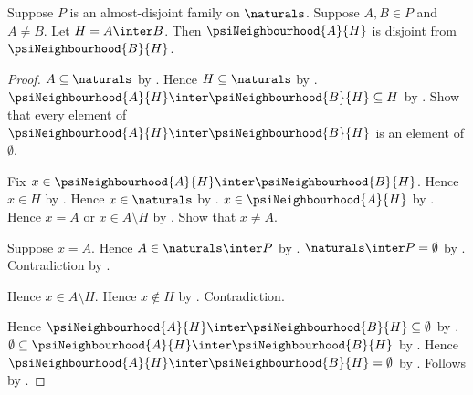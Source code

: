 \begin{proposition}\label{psi_distinct_family_neighbourhoods_disjoint}
    Suppose $P$ is an almost-disjoint family on $\naturals$.
    Suppose $A,B\in P$ and $A\neq B$.
    Let $H=A\inter B$.
    Then $\psiNeighbourhood{A}{H}$ is disjoint from
        $\psiNeighbourhood{B}{H}$.
\end{proposition}
\begin{proof}
    $A\subseteq\naturals$ by
        .
    Hence $H\subseteq\naturals$ by .
    $\psiNeighbourhood{A}{H}\inter\psiNeighbourhood{B}{H}
        \subseteq H$
        by .
    Show that every element of
        $\psiNeighbourhood{A}{H}\inter\psiNeighbourhood{B}{H}$
        is an element of $\emptyset$.
    \begin{subproof}
        Fix $x\in
            \psiNeighbourhood{A}{H}\inter\psiNeighbourhood{B}{H}$.
        Hence $x\in H$ by .
        Hence $x\in\naturals$ by .
        $x\in\psiNeighbourhood{A}{H}$ by .
        Hence $x=A$ or $x\in A\setminus H$
            by .
        Show that $x\neq A$.
        \begin{subproof}
            Suppose $x=A$.
            Hence $A\in\naturals\inter P$ by .
            $\naturals\inter P=\emptyset$
                by .
            Contradiction by .
        \end{subproof}
        Hence $x\in A\setminus H$.
        Hence $x\notin H$ by .
        Contradiction.
    \end{subproof}
    Hence $\psiNeighbourhood{A}{H}\inter
        \psiNeighbourhood{B}{H}\subseteq\emptyset$ by .
    $\emptyset\subseteq\psiNeighbourhood{A}{H}\inter
        \psiNeighbourhood{B}{H}$ by .
    Hence $\psiNeighbourhood{A}{H}\inter
        \psiNeighbourhood{B}{H}=\emptyset$
        by .
    Follows by .
\end{proof}

